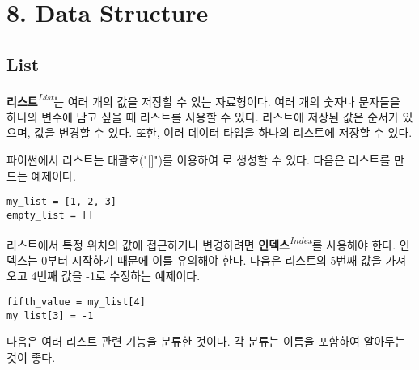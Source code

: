 \section[{8. Data Structure - {\it 데이터 구조}}]{8. Data Structure}

\subsection{List}

\textbf{리스트}\textit{\textsuperscript{List}}는 여러 개의 값을 저장할 수 있는 자료형이다. 여러 개의 숫자나 문자들을 하나의 변수에 담고 싶을 때 리스트를 사용할 수 있다. 리스트에 저장된 값은 순서가 있으며, 값을 변경할 수 있다. 또한, 여러 데이터 타입을 하나의 리스트에 저장할 수 있다.

파이썬에서 리스트는 대괄호("[]")를 이용하여 로 생성할 수 있다. 다음은 리스트를 만드는 예제이다.

\begin{tcolorbox}[colframe=black, colback=white]
\begin{verbatim}
my_list = [1, 2, 3]
empty_list = []
\end{verbatim}
\end{tcolorbox}

리스트에서 특정 위치의 값에 접근하거나 변경하려면 \textbf{인덱스}\textit{\textsuperscript{Index}}를 사용해야 한다. 인덱스는 0부터 시작하기 때문에 이를 유의해야 한다. 다음은 리스트의 5번째 값을 가져오고 4번째 값을 -1로 수정하는 예제이다.

\begin{tcolorbox}[colframe=black, colback=white]
\begin{verbatim}
fifth_value = my_list[4]
my_list[3] = -1
\end{verbatim}
\end{tcolorbox}

다음은 여러 리스트 관련 기능을 분류한 것이다. 각 분류는 이름을 포함하여 알아두는 것이 좋다.

